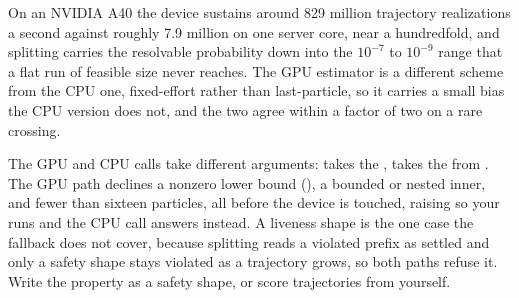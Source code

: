 On an NVIDIA A40 the device sustains around 829 million trajectory realizations a second against roughly 7.9 million on one server core, near a hundredfold, and splitting carries the resolvable probability down into the $10^{-7}$ to $10^{-9}$ range that a flat run of feasible size never reaches. The GPU estimator is a different scheme from the CPU one, fixed-effort rather than last-particle, so it carries a small bias the CPU version does not, and the two agree within a factor of two on a rare crossing.

\begin{pitfall}
The GPU and CPU calls take different arguments:  takes the ,  takes the  from . The GPU path declines a nonzero lower bound (), a bounded or nested inner, and fewer than sixteen particles, all before the device is touched, raising  so your  runs and the CPU call answers instead. A liveness shape is the one case the fallback does not cover, because splitting reads a violated prefix as settled and only a safety shape stays violated as a trajectory grows, so both paths refuse it. Write the property as a safety shape, or score trajectories from  yourself.
\end{pitfall}